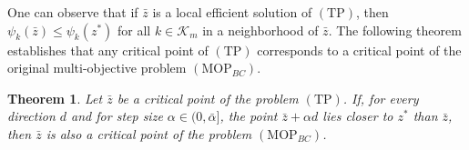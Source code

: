 \documentclass[amsa]{ipart}
\theoremstyle{plain}
\newtheorem{Theorem}{Theorem}[section]%
\numberwithin{equation}{section}
\newcommand{\Idx}[1]{\mathscr{K}_{#1}}        %
\newcommand{\xlm}{z^*}                    %
\newcommand{\obj}[1]{\psi_{#1}}               %
\begin{document}
One can observe that if $\bar{z}$ is a local efficient solution of $(\mathrm{TP})$, then $\obj{k}(\bar{z}) \leq \obj{k}(\xlm)$ for all $k \in \Idx{m}$ in a neighborhood of $\bar{z}$. The following theorem establishes that any critical point of $(\mathrm{TP})$ corresponds to a critical point of the original multi-objective problem $(\mathrm{MOP}_{BC})$.

\begin{Theorem}\label{theorem_3.1}
Let $\bar{z}$ be a critical point of the problem $(\mathrm{TP})$. 
If, for every direction $d$ and for step size $\alpha \in (0, \bar{\alpha}]$, 
the point $\bar{z} + \alpha d$ lies closer to $\xlm$ than $\bar{z}$, 
then $\bar{z}$ is also a critical point of the problem $(\mathrm{MOP}_{BC})$.
\end{Theorem}
\end{document}
